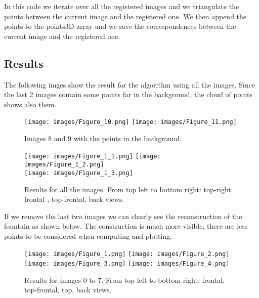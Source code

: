 \documentclass{ETHExercise}
\begin{document}
In this code we iterate over all the registered images and we triangulate the points
between the current image and the registered one. We then append the points to the
points3D array and we save the correspondences between the current image and the
registered one.

\subsection{Results}
The following imges show the result for the algorithm using all the images.
Since the last 2 images contain some points far in the background, the cloud of 
points shows also them.

\begin{figure}[!h]
    \texttt{[image: images/Figure\_10.png]}
  \endminipage
    \texttt{[image: images/Figure\_11.png]}
  \endminipage
  \caption{Images 8 and 9 with the points in the background.}
\end{figure}


\begin{figure}[!h]
    \texttt{[image: images/Figure\_1\_1.png]}
  \endminipage
    \texttt{[image: images/Figure\_1\_2.png]}
  \endminipage\\
    \texttt{[image: images/Figure\_1\_3.png]}
  \endminipage
  \caption{Results for all the images. From top left to bottom right:
  top-right frontal , top-frontal, back views.}
\end{figure}

\newpage
If we remove the last two images we can clearly see the reconstruction 
of the fountain as shown below. The construction is much more visible,
there are less points to be considered when computing and plotting.


\begin{figure}[!h]
    \texttt{[image: images/Figure\_1.png]}
  \endminipage
    \texttt{[image: images/Figure\_2.png]}
  \endminipage\\
    \texttt{[image: images/Figure\_3.png]}
  \endminipage
    \texttt{[image: images/Figure\_4.png]}
  \endminipage
  \caption{Results for images 0 to 7. From top left to bottom right:
  frontal, top-frontal, top, back views.}
\end{figure}
 
\end{document}
